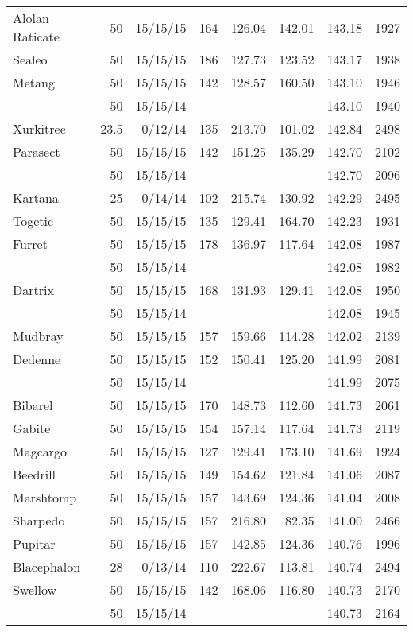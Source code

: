 \begin{longtable}{lrrrrrrr}
Alolan Raticate & 50 & 15/15/15 & 164 & 126.04 & 142.01 & 143.18 & 1927\\
Sealeo & 50 & 15/15/15 & 186 & 127.73 & 123.52 & 143.17 & 1938\\
Metang & 50 & 15/15/15 & 142 & 128.57 & 160.50 & 143.10 & 1946\\
 & 50 & 15/15/14 & & & & 143.10 & 1940\\
Xurkitree & 23.5 & 0/12/14 & 135 & 213.70 & 101.02 & 142.84 & 2498\\
Parasect & 50 & 15/15/15 & 142 & 151.25 & 135.29 & 142.70 & 2102\\
 & 50 & 15/15/14 & & & & 142.70 & 2096\\
Kartana & 25 & 0/14/14 & 102 & 215.74 & 130.92 & 142.29 & 2495\\
Togetic & 50 & 15/15/15 & 135 & 129.41 & 164.70 & 142.23 & 1931\\
Furret & 50 & 15/15/15 & 178 & 136.97 & 117.64 & 142.08 & 1987\\
 & 50 & 15/15/14 & & & & 142.08 & 1982\\
Dartrix & 50 & 15/15/15 & 168 & 131.93 & 129.41 & 142.08 & 1950\\
 & 50 & 15/15/14 & & & & 142.08 & 1945\\
Mudbray & 50 & 15/15/15 & 157 & 159.66 & 114.28 & 142.02 & 2139\\
Dedenne & 50 & 15/15/15 & 152 & 150.41 & 125.20 & 141.99 & 2081\\
 & 50 & 15/15/14 & & & & 141.99 & 2075\\
Bibarel & 50 & 15/15/15 & 170 & 148.73 & 112.60 & 141.73 & 2061\\
Gabite & 50 & 15/15/15 & 154 & 157.14 & 117.64 & 141.73 & 2119\\
Magcargo & 50 & 15/15/15 & 127 & 129.41 & 173.10 & 141.69 & 1924\\
Beedrill & 50 & 15/15/15 & 149 & 154.62 & 121.84 & 141.06 & 2087\\
Marshtomp & 50 & 15/15/15 & 157 & 143.69 & 124.36 & 141.04 & 2008\\
Sharpedo & 50 & 15/15/15 & 157 & 216.80 & 82.35 & 141.00 & 2466\\
Pupitar & 50 & 15/15/15 & 157 & 142.85 & 124.36 & 140.76 & 1996\\
Blacephalon & 28 & 0/13/14 & 110 & 222.67 & 113.81 & 140.74 & 2494\\
Swellow & 50 & 15/15/15 & 142 & 168.06 & 116.80 & 140.73 & 2170\\
 & 50 & 15/15/14 & & & & 140.73 & 2164\\

\end{longtable}
